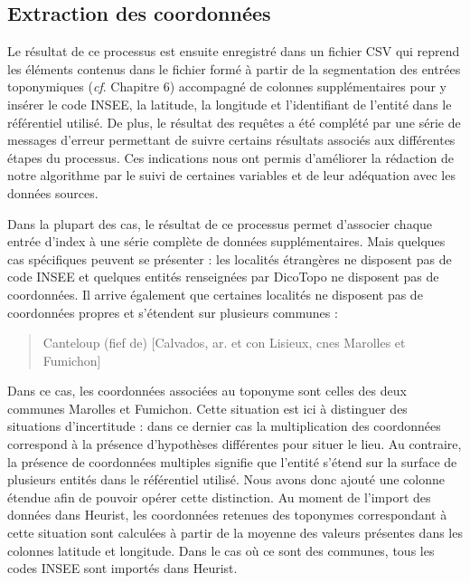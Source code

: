 \documentclass[a4paper,12pt,twoside]{book}
\begin{document}
	\subsection{Extraction des coordonnées}
	
	Le résultat de ce processus est ensuite enregistré dans un fichier CSV qui reprend les éléments contenus dans le fichier formé à partir de la segmentation des entrées toponymiques (\textit{cf}. Chapitre 6) accompagné de colonnes supplémentaires pour y insérer le code INSEE, la latitude, la longitude et l'identifiant de l'entité dans le référentiel utilisé. De plus, le résultat des requêtes a été complété par une série de messages d'erreur permettant de suivre certains résultats associés aux différentes étapes du processus. Ces indications nous ont permis d'améliorer la rédaction de notre algorithme par le suivi de certaines variables et de leur adéquation avec les données sources.
	
	Dans la plupart des cas, le résultat de ce processus permet d'associer chaque entrée d'index à une série complète de données supplémentaires. Mais quelques cas spécifiques peuvent se présenter : les localités étrangères ne disposent pas de code INSEE et quelques entités renseignées par DicoTopo ne disposent pas de coordonnées. Il arrive également que certaines localités ne disposent pas de coordonnées propres et s'étendent sur plusieurs communes :
	
	\begin{quotation}
		Canteloup (fief de) [Calvados, ar. et con Lisieux, cnes Marolles et Fumichon]
	\end{quotation}

	Dans ce cas, les coordonnées associées au toponyme sont celles des deux communes Marolles et Fumichon. Cette situation est ici à distinguer des situations d'incertitude : dans ce dernier cas la multiplication des coordonnées correspond à la présence d'hypothèses différentes pour situer le lieu. Au contraire, la présence de coordonnées multiples signifie que l'entité s'étend sur la surface de plusieurs entités dans le référentiel utilisé. Nous avons donc ajouté une colonne \og étendue\fg{} afin de pouvoir opérer cette distinction. Au moment de l'import des données dans Heurist, les coordonnées retenues des toponymes correspondant à cette situation sont calculées à partir de la moyenne des valeurs présentes dans les colonnes \og latitude\fg{} et \og longitude\fg{}. Dans le cas où ce sont des communes, tous les codes INSEE sont importés dans Heurist.
	
\end{document}
